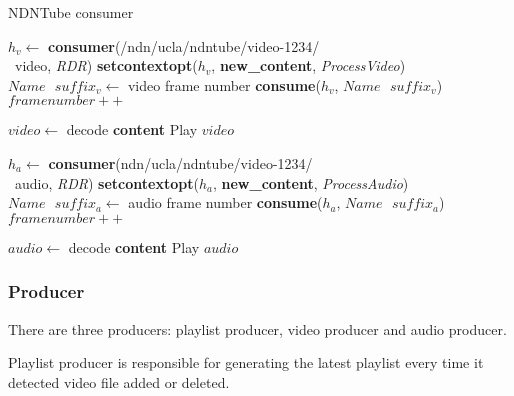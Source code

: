 \begin{algorithm}[ht]
\caption{NDNTube consumer}
\label{alg:recordconsumer}
\begin{algorithmic}[4]
\State $h_v \leftarrow $ \textbf{consumer}(/ndn/ucla/ndntube/video-1234/ \\\ video, \textit{RDR})
\State \textbf{setcontextopt}($h_v$, \textbf{new\_content}, \textit{ProcessVideo})
\vspace{0.2cm}
	\State $Name \textbf{ } suffix_v \leftarrow $ video frame number
	\State \textbf{consume}($h_v$, $Name\textbf{ }suffix_v$)
	\State $framenumber ++$
	\EndWhile
\vspace{0.2cm}

   \State $video \leftarrow $ decode \textbf{content}
   \State Play $video$
\EndFunction

\vspace{0.4cm}

\State $h_a \leftarrow $ \textbf{consumer}(ndn/ucla/ndntube/video-1234/ \\\ audio, \textit{RDR})
\State \textbf{setcontextopt}($h_a$, \textbf{new\_content}, \textit{ProcessAudio})
\vspace{0.2cm}
	\State $Name \textbf{ } suffix_a \leftarrow $ audio frame number
	\State \textbf{consume}($h_a$, $Name\textbf{ }suffix_a$)
	\State $framenumber ++$
	\EndWhile
\vspace{0.2cm}

   	\State $audio \leftarrow $ decode \textbf{content}
   	\State Play $audio$
\EndFunction
\end{algorithmic}
\end{algorithm}

\subsubsection{Producer}

There are three producers: playlist producer, video producer and audio producer.

Playlist producer is responsible for generating the latest playlist every time it detected video file added or deleted.

